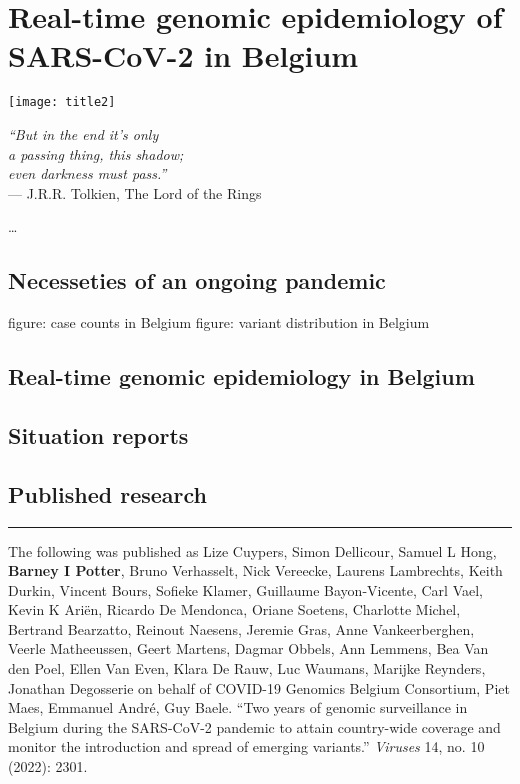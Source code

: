 \chapter{Real-time genomic epidemiology of SARS-CoV-2 in Belgium}\label{ch:chapter1}

\begin{minipage}[b]{0.6\textwidth}
    \texttt{[image: title2]} %
  \end{minipage}
  \hfill
  \begin{minipage}[b]{0.35\textwidth}
    \footnotesize
    \begin{flushright}
      \textit{``But in the end it's only\\a passing thing, this shadow;\\even darkness must pass.''} \\
      --- J.R.R.
Tolkien, The Lord of the Rings
    \end{flushright}
    \vspace{2cm}
  \end{minipage}
  
  \clearpage
\ldots

\section{Necesseties of an ongoing pandemic}
figure: case counts in Belgium
figure: variant distribution in Belgium

\section{Real-time genomic epidemiology in Belgium}

\section{Situation reports}

\section{Published research}

\hrule
\vspace*{12pt}
The following was published as Lize Cuypers, Simon Dellicour, Samuel L Hong, \textbf{Barney I Potter}, Bruno Verhasselt, Nick Vereecke, Laurens Lambrechts, Keith Durkin, Vincent Bours, Sofieke Klamer, Guillaume Bayon-Vicente, Carl Vael, Kevin K Ari\"{e}n, Ricardo De Mendonca, Oriane Soetens, Charlotte Michel, Bertrand Bearzatto, Reinout Naesens, Jeremie Gras, Anne Vankeerberghen, Veerle Matheeussen, Geert Martens, Dagmar Obbels, Ann Lemmens, Bea Van den Poel, Ellen Van Even, Klara De Rauw, Luc Waumans, Marijke Reynders, Jonathan Degosserie on behalf of COVID-19 Genomics Belgium Consortium, Piet Maes, Emmanuel Andr\'{e}, Guy Baele.
``Two years of genomic surveillance in Belgium during the SARS-CoV-2 pandemic to attain country-wide coverage and monitor the introduction and spread of emerging variants.'' \textit{Viruses} 14, no.
10 (2022): 2301.

